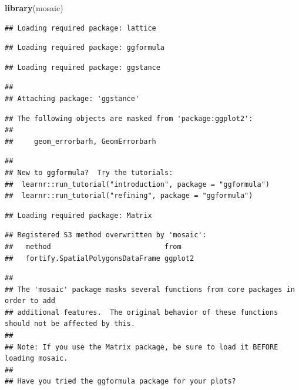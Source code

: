\documentclass[
]{book}
\newenvironment{Shaded}{\begin{snugshade}}{\end{snugshade}}
\newcommand{\KeywordTok}[1]{\textcolor[rgb]{0.13,0.29,0.53}{\textbf{#1}}}
\newcommand{\NormalTok}[1]{#1}
\begin{document}
\begin{Shaded}
\begin{Highlighting}[]
\KeywordTok{library}\NormalTok{(mosaic) }
\end{Highlighting}
\end{Shaded}

\begin{verbatim}
## Loading required package: lattice
\end{verbatim}

\begin{verbatim}
## Loading required package: ggformula
\end{verbatim}

\begin{verbatim}
## Loading required package: ggstance
\end{verbatim}

\begin{verbatim}
## 
## Attaching package: 'ggstance'
\end{verbatim}

\begin{verbatim}
## The following objects are masked from 'package:ggplot2':
## 
##     geom_errorbarh, GeomErrorbarh
\end{verbatim}

\begin{verbatim}
## 
## New to ggformula?  Try the tutorials: 
## 	learnr::run_tutorial("introduction", package = "ggformula")
## 	learnr::run_tutorial("refining", package = "ggformula")
\end{verbatim}

\begin{verbatim}
## Loading required package: Matrix
\end{verbatim}

\begin{verbatim}
## Registered S3 method overwritten by 'mosaic':
##   method                           from   
##   fortify.SpatialPolygonsDataFrame ggplot2
\end{verbatim}

\begin{verbatim}
## 
## The 'mosaic' package masks several functions from core packages in order to add 
## additional features.  The original behavior of these functions should not be affected by this.
## 
## Note: If you use the Matrix package, be sure to load it BEFORE loading mosaic.
## 
## Have you tried the ggformula package for your plots?
\end{verbatim}
\end{document}
